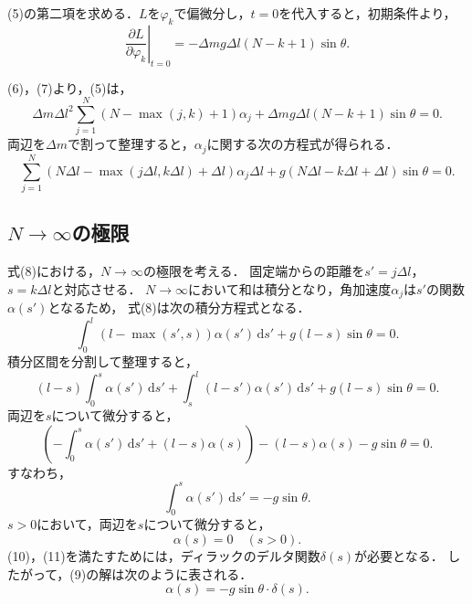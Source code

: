 \documentclass[paper=a4,fontsize=11pt,lualatex]{jlreq}
\begin{document}
(5)の第二項を求める．$L$を$\varphi_k$で偏微分し，$t = 0$を代入すると，初期条件より，
\begin{equation}
  \left.\frac{\partial L}{\partial \varphi_k}\right|_{t = 0}
  = - \varDelta m g \varDelta l \left(N - k + 1\right) \sin \theta.
\end{equation}

(6)，(7)より，(5)は，
\begin{equation*}
  \varDelta m {\varDelta l}^2 \sum_{j = 1}^{N}
  \left(N - \max \left(j, k\right) + 1\right) \alpha_j
  + \varDelta m g \varDelta l \left(N - k + 1\right) \sin \theta = 0.
\end{equation*}
両辺を$\varDelta m$で割って整理すると，$\alpha_j$に関する次の方程式が得られる．
\begin{equation}
  \sum_{j = 1}^{N} \left(N \varDelta l
  - \max \left(j \varDelta l, k \varDelta l\right) + \varDelta l\right) \alpha_j
  \varDelta l + g \left(N \varDelta l - k \varDelta l + \varDelta l\right) \sin \theta = 0.
\end{equation}

\subsection{$N \rightarrow \infty$の極限}
式(8)における，$N \rightarrow \infty$の極限を考える．
固定端からの距離を$s' = j \varDelta l$，$s = k \varDelta l$と対応させる．
$N \rightarrow \infty$において和は積分となり，角加速度$\alpha_j$は$s'$の関数$\alpha\left(s'\right)$となるため，
式(8)は次の積分方程式となる．
\begin{equation}
  \int_{0}^{l} \left(l - \max \left(s', s\right)\right)
  \alpha\left(s'\right) \,\mathrm{d}s'
  + g \left(l - s\right) \sin \theta = 0. 
\end{equation}
積分区間を分割して整理すると，
\begin{equation*}
  \left(l - s\right) \int_{0}^{s} \alpha\left(s'\right) \,\mathrm{d}s'
  + \int_{s}^{l} \left(l - s'\right) \alpha\left(s'\right) \,\mathrm{d}s'
  + g \left(l - s\right) \sin \theta = 0.
\end{equation*}
両辺を$s$について微分すると，
\begin{equation*}
  \left( - \int_{0}^{s} \alpha\left(s'\right) \,\mathrm{d}s'
  + \left(l - s\right) \alpha\left(s\right) \right)
  - \left(l - s\right) \alpha\left(s\right)
  - g \sin \theta = 0.
\end{equation*}
すなわち，
\begin{equation}
  \int_{0}^{s} \alpha\left(s'\right) \,\mathrm{d}s' = -g \sin \theta.
\end{equation}
$s > 0$において，両辺を$s$について微分すると，
\begin{equation}
  \alpha\left(s\right) = 0 \quad \left(s > 0\right).
\end{equation}
(10)，(11)を満たすためには，ディラックのデルタ関数$\delta \left(s\right)$が必要となる．
したがって，(9)の解は次のように表される．
\begin{equation}
  \alpha\left(s\right) = -g \sin \theta \cdot \delta \left(s\right).
\end{equation}
\end{document}
